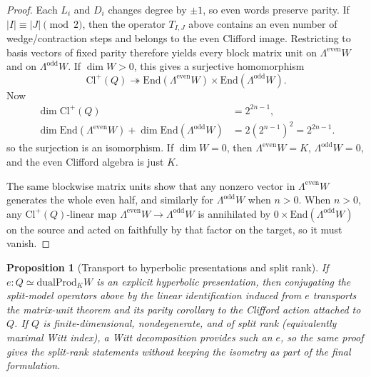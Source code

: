 \documentclass{birkjour}
\theoremstyle{plain}
\newtheorem{proposition}[theorem]{Proposition}
\theoremstyle{definition}
\theoremstyle{remark}
\newcommand{\Cl}{\mathrm{Cl}}
\newcommand{\End}{\mathrm{End}}
\newcommand{\dualProd}{\mathrm{dualProd}}
\newcommand{\wedgeEven}{\Lambda^{\mathrm{even}} W}
\newcommand{\wedgeOdd}{\Lambda^{\mathrm{odd}} W}
\begin{document}
\begin{proof}
Each $L_i$ and $D_i$ changes degree by $\pm 1$, so even words preserve parity.
If $|I|\equiv |J|\pmod 2$, then the operator $T_{I,J}$ above contains an even
number of wedge/contraction steps and belongs to the even Clifford image.
Restricting to basis vectors of fixed parity therefore yields every block matrix
unit on $\wedgeEven$ and on $\wedgeOdd$. If $\dim W>0$, this gives a surjective
homomorphism
\[
  \Cl^+(Q)\twoheadrightarrow \End(\wedgeEven)\times \End(\wedgeOdd).
\]
Now
\[
  \begin{aligned}
  \dim \Cl^+(Q) &= 2^{2n-1}, \\
  \dim \End(\wedgeEven)+\dim \End(\wedgeOdd)
    &= 2(2^{n-1})^2 = 2^{2n-1}.
  \end{aligned}
\]
so the surjection is an isomorphism. If $\dim W=0$, then $\wedgeEven=K$,
$\wedgeOdd=0$, and the even Clifford algebra is just $K$.

The same blockwise matrix units show that any nonzero vector in $\wedgeEven$
generates the whole even half, and similarly for $\wedgeOdd$ when $n>0$.
When $n>0$, any $\Cl^+(Q)$-linear map $\wedgeEven\to\wedgeOdd$ is annihilated by
$0\times \End(\wedgeOdd)$ on the source and acted on faithfully by that factor
on the target, so it must vanish.
\end{proof}

\begin{proposition}[Transport to hyperbolic presentations and split rank]
\label{prop:transport-split}
If $e:Q \simeq \dualProd_K W$ is an explicit hyperbolic presentation, then
conjugating the split-model operators above by the linear identification
induced from $e$ transports the matrix-unit theorem and its parity corollary to
the Clifford action attached to $Q$. If $Q$ is finite-dimensional,
nondegenerate, and of split rank (equivalently maximal Witt index), a Witt decomposition provides
such an $e$, so the same proof gives the split-rank statements without keeping
the isometry as part of the final formulation.
\end{proposition}
\end{document}

